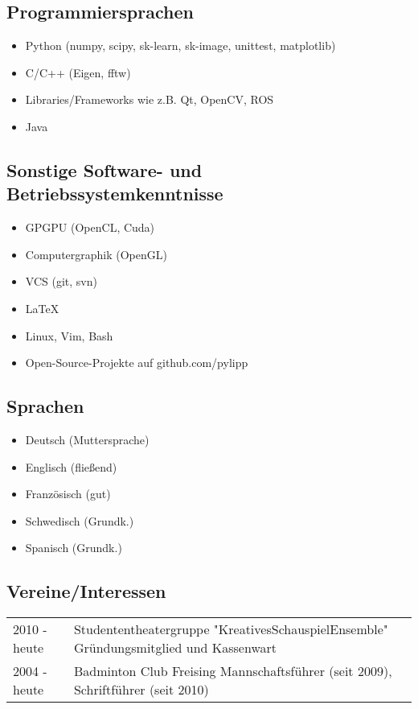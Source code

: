 \documentclass[a4paper,10pt]{memoir}
\begin{document}
\subsection*{Programmiersprachen}
\begin{itemize}
  \item Python (numpy, scipy, sk-learn, sk-image, unittest, matplotlib)
  \item C/C++ (Eigen, fftw)
  \item Libraries/Frameworks wie z.B. Qt, OpenCV, ROS
  \item Java 
\end{itemize}

\subsection*{Sonstige Software- und Betriebssystemkenntnisse}
\vspace*{-\baselineskip}
\begin{multicols}{2}
\begin{itemize}
  \item GPGPU (OpenCL, Cuda)
  \item Computergraphik (OpenGL)
  \item VCS (git, svn)
  \item \LaTeX
  \item Linux, Vim, Bash
  \item Open-Source-Projekte auf github.com/pylipp
\end{itemize}
\end{multicols}

\subsection*{Sprachen}
\vspace*{-\baselineskip}
\begin{multicols}{3}
  \begin{itemize}
    \item Deutsch (Muttersprache)
    \item Englisch (fließend)
    \item Französisch (gut)
    \item Schwedisch (Grundk.)
    \item Spanisch (Grundk.)
  \end{itemize}
\end{multicols}

\subsection*{Vereine/Interessen}
\vspace*{-\baselineskip}
\begin{longtable}{@{}p{} p{}}
  2010 - heute &
  Studententheatergruppe "KreativesSchauspielEnsemble" \newline 
  Gründungsmitglied und Kassenwart 
  \\
  2004 - heute &
  Badminton Club Freising \newline 
  Mannschaftsführer (seit 2009), Schriftführer (seit 2010)
\end{longtable}
\end{document}
